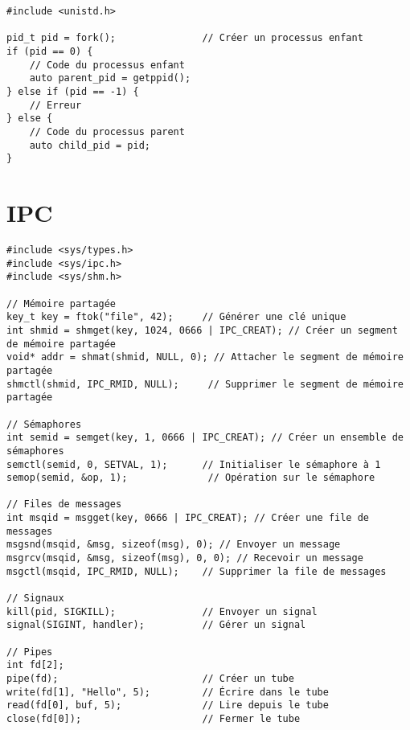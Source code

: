 \documentclass{article}
\begin{document}
\begin{multicols*}{3}
\begin{lstlisting}
#include <unistd.h>

pid_t pid = fork();               // Créer un processus enfant
if (pid == 0) {
    // Code du processus enfant
    auto parent_pid = getppid();
} else if (pid == -1) {
    // Erreur
} else {
    // Code du processus parent
    auto child_pid = pid;
}
\end{lstlisting}

\section*{IPC}

\begin{lstlisting}
#include <sys/types.h>
#include <sys/ipc.h>
#include <sys/shm.h>

// Mémoire partagée
key_t key = ftok("file", 42);     // Générer une clé unique
int shmid = shmget(key, 1024, 0666 | IPC_CREAT); // Créer un segment de mémoire partagée
void* addr = shmat(shmid, NULL, 0); // Attacher le segment de mémoire partagée
shmctl(shmid, IPC_RMID, NULL);     // Supprimer le segment de mémoire partagée

// Sémaphores
int semid = semget(key, 1, 0666 | IPC_CREAT); // Créer un ensemble de sémaphores
semctl(semid, 0, SETVAL, 1);      // Initialiser le sémaphore à 1
semop(semid, &op, 1);              // Opération sur le sémaphore

// Files de messages
int msqid = msgget(key, 0666 | IPC_CREAT); // Créer une file de messages
msgsnd(msqid, &msg, sizeof(msg), 0); // Envoyer un message
msgrcv(msqid, &msg, sizeof(msg), 0, 0); // Recevoir un message
msgctl(msqid, IPC_RMID, NULL);    // Supprimer la file de messages

// Signaux
kill(pid, SIGKILL);               // Envoyer un signal
signal(SIGINT, handler);          // Gérer un signal

// Pipes
int fd[2];
pipe(fd);                         // Créer un tube
write(fd[1], "Hello", 5);         // Écrire dans le tube
read(fd[0], buf, 5);              // Lire depuis le tube
close(fd[0]);                     // Fermer le tube
\end{lstlisting}

\end{multicols*}
\end{document}
